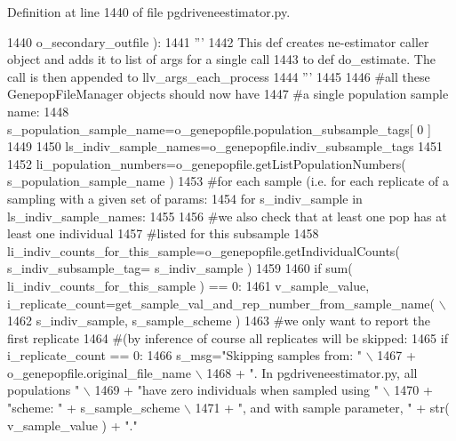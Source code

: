 Definition at line 1440 of file pgdriveneestimator.\+py.


\begin{DoxyCode}
1440                         o\_secondary\_outfile ):
1441     \textcolor{stringliteral}{'''     }
1442 \textcolor{stringliteral}{    This def creates ne-estimator caller object and adds it to list of args for a single call}
1443 \textcolor{stringliteral}{    to def do\_estimate.  The call is then appended to llv\_args\_each\_process}
1444 \textcolor{stringliteral}{    '''}
1445 
1446     \textcolor{comment}{#all these GenepopFileManager objects should now have}
1447     \textcolor{comment}{#a single population sample name:}
1448     s\_population\_sample\_name=o\_genepopfile.population\_subsample\_tags[ 0 ]
1449 
1450     ls\_indiv\_sample\_names=o\_genepopfile.indiv\_subsample\_tags
1451 
1452     li\_population\_numbers=o\_genepopfile.getListPopulationNumbers( s\_population\_sample\_name )
1453     \textcolor{comment}{#for each sample (i.e. for each replicate of a sampling with a given set of params:}
1454     \textcolor{keywordflow}{for} s\_indiv\_sample \textcolor{keywordflow}{in} ls\_indiv\_sample\_names:
1455 
1456         \textcolor{comment}{#we also check that at least one pop has at least one individual}
1457         \textcolor{comment}{#listed for this subsample}
1458         li\_indiv\_counts\_for\_this\_sample=o\_genepopfile.getIndividualCounts( s\_indiv\_subsample\_tag=
      s\_indiv\_sample )
1459     
1460         \textcolor{keywordflow}{if} sum( li\_indiv\_counts\_for\_this\_sample ) == 0:
1461             v\_sample\_value, i\_replicate\_count=get\_sample\_val\_and\_rep\_number\_from\_sample\_name( \(\backslash\)
1462                                             s\_indiv\_sample, s\_sample\_scheme )
1463             \textcolor{comment}{#we only want to report the first replicate}
1464             \textcolor{comment}{#(by inference of course all replicates will be skipped:}
1465             \textcolor{keywordflow}{if} i\_replicate\_count == 0:
1466                 s\_msg=\textcolor{stringliteral}{"Skipping samples from: "} \(\backslash\)
1467                         + o\_genepopfile.original\_file\_name \(\backslash\)
1468                         + \textcolor{stringliteral}{".  In pgdriveneestimator.py, all populations "} \(\backslash\)
1469                         + \textcolor{stringliteral}{"have zero individuals when sampled using "} \(\backslash\)
1470                         + \textcolor{stringliteral}{"scheme: "} + s\_sample\_scheme \(\backslash\)
1471                         + \textcolor{stringliteral}{", and with sample parameter, "} + str( v\_sample\_value ) + \textcolor{stringliteral}{"."}

\end{DoxyCode}
